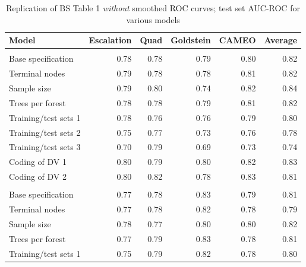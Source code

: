 \documentclass[]{article}
\begin{document}
\begin{table}[t]

\caption{\label{tab:table1-nosmooth}Replication of BS Table 1 \textit{without} smoothed ROC curves; test set AUC-ROC for various models}
\centering
\begin{tabular}{lrrrrr}
\toprule
Model & Escalation & Quad & Goldstein & CAMEO & Average\\
\midrule
\addlinespace[0.3em]
\multicolumn{6}{l}{\textbf{One-month forecasts}}\\
\hspace{1em}Base specification & 0.78 & 0.78 & 0.79 & 0.80 & 0.82\\
\hspace{1em}Terminal nodes & 0.79 & 0.78 & 0.78 & 0.81 & 0.82\\
\hspace{1em}Sample size & 0.79 & 0.80 & 0.74 & 0.82 & 0.84\\
\hspace{1em}Trees per forest & 0.78 & 0.78 & 0.79 & 0.81 & 0.82\\
\hspace{1em}Training/test sets 1 & 0.78 & 0.76 & 0.76 & 0.79 & 0.80\\
\hspace{1em}Training/test sets 2 & 0.75 & 0.77 & 0.73 & 0.76 & 0.78\\
\hspace{1em}Training/test sets 3 & 0.70 & 0.79 & 0.69 & 0.73 & 0.74\\
\hspace{1em}Coding of DV 1 & 0.80 & 0.79 & 0.80 & 0.82 & 0.83\\
\hspace{1em}Coding of DV 2 & 0.80 & 0.82 & 0.78 & 0.83 & 0.81\\
\addlinespace[0.3em]
\multicolumn{6}{l}{\textbf{Six-month forecasts}}\\
\hspace{1em}Base specification & 0.77 & 0.78 & 0.83 & 0.79 & 0.81\\
\hspace{1em}Terminal nodes & 0.77 & 0.78 & 0.82 & 0.78 & 0.79\\
\hspace{1em}Sample size & 0.78 & 0.77 & 0.80 & 0.80 & 0.82\\
\hspace{1em}Trees per forest & 0.77 & 0.79 & 0.83 & 0.78 & 0.81\\
\hspace{1em}Training/test sets 1 & 0.75 & 0.79 & 0.82 & 0.78 & 0.80\\

\end{tabular}
\end{table}
\end{document}
